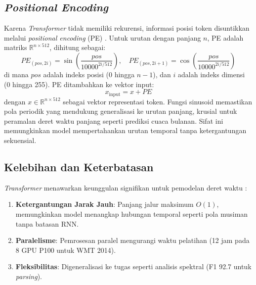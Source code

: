 \subsection{\textit{Positional Encoding}}
\label{sec:positional_encoding}

Karena \textit{Transformer} tidak memiliki rekurensi, informasi posisi token disuntikkan melalui \textit{positional encoding} (PE) \citep{Vaswani2017}. Untuk urutan dengan panjang \( n \), PE adalah matriks \( \mathbb{R}^{n \times 512} \), dihitung sebagai:
\begin{equation}
PE_{(pos, 2i)} = \sin\left(\frac{pos}{10000^{2i/512}}\right), \quad PE_{(pos, 2i+1)} = \cos\left(\frac{pos}{10000^{2i/512}}\right)
\end{equation}
di mana \( pos \) adalah indeks posisi (0 hingga \( n-1 \)), dan \( i \) adalah indeks dimensi (0 hingga 255). PE ditambahkan ke vektor input:
\begin{equation}
x_{\text{input}} = x + PE
\end{equation}
dengan \( x \in \mathbb{R}^{n \times 512} \) sebagai vektor representasi token. Fungsi sinusoid memastikan pola periodik yang mendukung generalisasi ke urutan panjang, krusial untuk peramalan deret waktu panjang seperti prediksi cuaca bulanan. Sifat ini memungkinkan model mempertahankan urutan temporal tanpa ketergantungan sekuensial.

\subsection{Kelebihan dan Keterbatasan}
\label{sec:transformer_limits}

\textit{Transformer} menawarkan keunggulan signifikan untuk pemodelan deret waktu \citep{Vaswani2017}:
\begin{enumerate}
    \item \textbf{Ketergantungan Jarak Jauh}: Panjang jalur maksimum \( O(1) \), memungkinkan model menangkap hubungan temporal seperti pola musiman tanpa batasan RNN.
    \item \textbf{Paralelisme}: Pemrosesan paralel mengurangi waktu pelatihan (12 jam pada 8 GPU P100 untuk WMT 2014).
    \item \textbf{Fleksibilitas}: Digeneralisasi ke tugas seperti analisis spektral (F1 92.7 untuk \textit{parsing}).
\end{enumerate}

